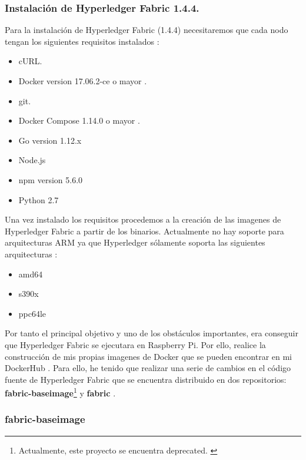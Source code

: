 \newpage

\subsubsection*{Instalación de Hyperledger Fabric 1.4.4.}

Para la instalación de Hyperledger Fabric (1.4.4) necesitaremos que cada nodo tengan los siguientes requisitos instalados 
\cite{hyperledger-fabric-docs}:

\begin{itemize}
  \item cURL.
  \item Docker version 17.06.2-ce o mayor \cite{install-docker-rasp, set-up-docker-rasp}.
  \item git.
  \item Docker Compose 1.14.0 o mayor \cite{install-docker-rasp, set-up-docker-rasp}.
  \item Go version 1.12.x
  \item Node.js
  \item npm version 5.6.0
  \item Python 2.7
\end{itemize}

\noindent Una vez instalado los requisitos procedemos a la creación de las imagenes de Hyperledger Fabric a partir de 
los binarios. Actualmente no hay soporte para arquitecturas ARM ya que Hyperledger sólamente soporta las siguientes 
arquitecturas \cite{build-docker-images}:

\begin{itemize}
  \item amd64
  \item s390x
  \item ppc64le
\end{itemize}

\noindent Por tanto el principal objetivo y uno de los obstáculos importantes, era conseguir que Hyperledger Fabric 
se ejecutara en Raspberry Pi. Por ello, realice la construcción de mis propias imagenes de Docker que se pueden 
encontrar en mi DockerHub \cite{dockerhub}. Para ello, he tenido que realizar una serie de cambios en el código fuente
de Hyperledger Fabric que se encuentra distribuido en dos repositorios: \textbf{fabric-baseimage}\footnote{Actualmente, 
este proyecto se encuentra deprecated. \label{fnlabel}} y \textbf{fabric} \cite{fabric-baseimage, fabric}. 

\subsubsection*{fabric-baseimage}

